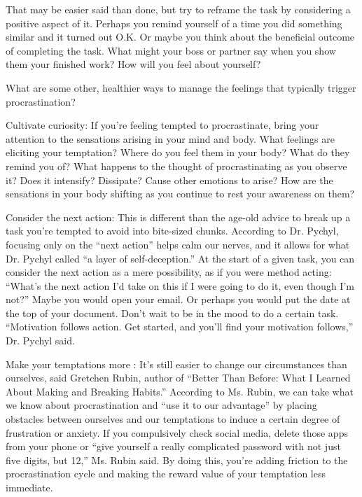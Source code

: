 \documentclass[10pt,a4paper]{book}
\newcommand{\glos}[3]{\dotuline{#1}\marginpar{\scriptsize\textit{#3} #2}}
\begin{document}
That may be easier said than done, but try to reframe the task by considering a positive aspect of it. Perhaps you remind yourself of a time you did something similar and it turned out O.K. Or maybe you think about the beneficial outcome of completing the task. What might your boss or partner say when you show them your finished work? How will you feel about yourself?

What are some other, healthier ways to manage the feelings that typically trigger procrastination?

Cultivate curiosity: If you’re feeling tempted to procrastinate, bring your attention to the sensations arising in your mind and body. What feelings are eliciting your temptation? Where do you feel them in your body? What do they remind you of? What happens to the thought of procrastinating as you observe it? Does it intensify? Dissipate? Cause other emotions to arise? How are the sensations in your body shifting as you continue to rest your awareness on them?

Consider the next action: This is different than the age-old advice to break up a task you’re tempted to avoid into bite-sized chunks. According to Dr. Pychyl, focusing only on the “next action” helps calm our nerves, and it allows for what Dr. Pychyl called “a layer of self-deception.” At the start of a given task, you can consider the next action as a mere possibility, as if you were method acting: “What’s the next action I’d take on this if I were going to do it, even though I’m not?” Maybe you would open your email. Or perhaps you would put the date at the top of your document. Don’t wait to be in the mood to do a certain task. “Motivation follows action. Get started, and you’ll find your motivation follows,” Dr. Pychyl said.

Make your temptations more \glos{inconvenient}{ubelejlig / besværlig}{adj.}: It’s still easier to change our circumstances than ourselves, said Gretchen Rubin, author of “Better Than Before: What I Learned About Making and Breaking Habits.” According to Ms. Rubin, we can take what we know about procrastination and “use it to our advantage” by placing obstacles between ourselves and our temptations to induce a certain degree of frustration or anxiety. If you compulsively check social media, delete those apps from your phone or “give yourself a really complicated password with not just five digits, but 12,” Ms. Rubin said. By doing this, you’re adding friction to the procrastination cycle and making the reward value of your temptation less immediate.
\end{document}
